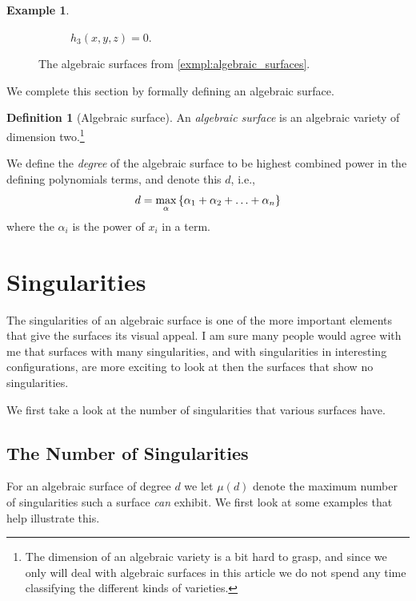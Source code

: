 \documentclass{article}
\theoremstyle{definition}
\newtheorem{definition}{Definition}
\newtheorem{example}{Example}
\begin{document}
\begin{example}
\begin{figure}[]
\begin{subfigure}[t]{0.3\textwidth}
            \caption{$h_3(x, y, z) = 0$.}
        \end{subfigure}
        \caption{The algebraic surfaces from \cref{exmpl:algebraic_surfaces}.}
        \label{fig:algebraic_surfaces}
    \end{figure}
\end{example}

We complete this section by formally defining an algebraic surface.
\begin{definition}[Algebraic surface]
    An \emph{algebraic surface} is an algebraic variety of dimension
    two.\footnote{The dimension of an algebraic variety is a bit hard to grasp,
    and since we only will deal with algebraic surfaces in this article we do
    not spend any time classifying the different kinds of varieties.}

    We define the \emph{degree} of the algebraic surface to be highest combined
    power in the defining polynomials terms, and denote this $d$, i.e.,
    \begin{equation}
        \notag
        d = \max_{\alpha}\left\{\alpha_1 + \alpha_2 + \ldots + \alpha_n\right\}
    \end{equation}
    where the $\alpha_i$ is the power of $x_i$ in a term.
\end{definition}


\section{Singularities}
\label{sec:singularities}

The singularities of an algebraic surface is one of the more important elements
that give the surfaces its visual appeal. I am sure many people would agree
with me that surfaces with many singularities, and with singularities in
interesting configurations, are more exciting to look at then the surfaces that
show no singularities. 

We first take a look at the number of singularities that various surfaces have.

\subsection{The Number of Singularities}
\label{sub:the_number_of_singularities}

For an algebraic surface of degree $d$ we let $\mu(d)$ denote the maximum
number of singularities such a surface \emph{can} exhibit. We first look at
some examples that help illustrate this.
\end{document}
